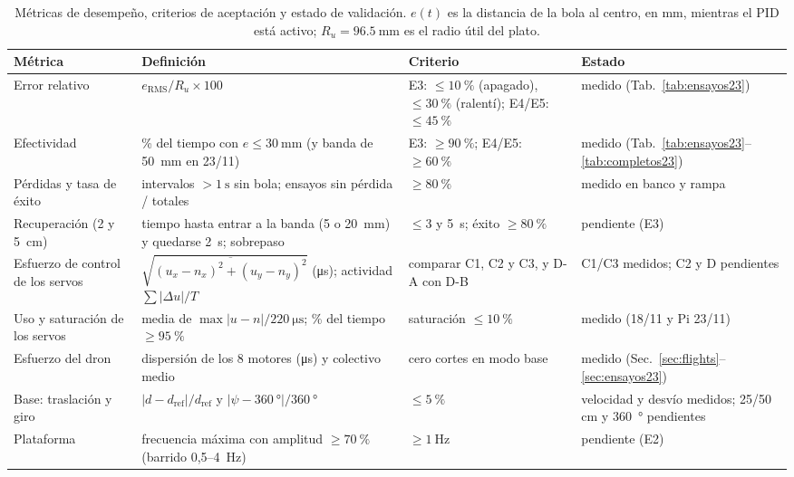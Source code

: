 \begin{table}[!htbp]
\centering
\small
\caption{Métricas de desempeño, criterios de aceptación y estado de validación. $e(t)$ es la distancia de la bola al centro, en mm, mientras el PID está activo; $R_u=\SI{96.5}{\milli\metre}$ es el radio útil del plato.}
\label{tab:metricas}
\begin{tabularx}{\textwidth}{@{}>{\raggedright\arraybackslash}p{}>{\raggedright\arraybackslash}X>{\raggedright\arraybackslash}p{}>{\raggedright\arraybackslash}p{}@{}}
\toprule
Métrica & Definición & Criterio & Estado \\
\midrule
Error relativo & $e_{\mathrm{RMS}}/R_u\times100$ & E3: $\le\SI{10}{\percent}$ (apagado), $\le\SI{30}{\percent}$ (ralentí); E4/E5: $\le\SI{45}{\percent}$ & medido (Tab.~\ref{tab:ensayos23}) \\
Efectividad & \% del tiempo con $e\le\SI{30}{\milli\metre}$ (y banda de \SI{50}{\milli\metre} en 23/11) & E3: $\ge\SI{90}{\percent}$; E4/E5: $\ge\SI{60}{\percent}$ & medido (Tab.~\ref{tab:ensayos23}--\ref{tab:completos23}) \\
Pérdidas y tasa de éxito & intervalos $>\SI{1}{\second}$ sin bola; ensayos sin pérdida / totales & $\ge\SI{80}{\percent}$ & medido en banco y rampa \\
Recuperación (2 y \SI{5}{\centi\metre}) & tiempo hasta entrar a la banda (5 o \SI{20}{\milli\metre}) y quedarse \SI{2}{\second}; sobrepaso & $\le$3 y \SI{5}{\second}; éxito $\ge\SI{80}{\percent}$ & pendiente (E3) \\
Esfuerzo de control de los servos & $\sqrt{\overline{(u_x-n_x)^2+(u_y-n_y)^2}}$ (\si{\micro\second}); actividad $\sum|\Delta u|/T$ & comparar C1, C2 y C3, y D-A con D-B & C1/C3 medidos; C2 y D pendientes \\
Uso y saturación de los servos & media de $\max|u-n|/\SI{220}{\micro\second}$; \% del tiempo $\ge\SI{95}{\percent}$ & saturación $\le\SI{10}{\percent}$ & medido (18/11 y Pi 23/11) \\
Esfuerzo del dron & dispersión de los 8 motores (\si{\micro\second}) y colectivo medio & cero cortes en modo base & medido (Sec.~\ref{sec:flights}--\ref{sec:ensayos23}) \\
Base: traslación y giro & $|d-d_{\mathrm{ref}}|/d_{\mathrm{ref}}$ y $|\psi-\SI{360}{\degree}|/\SI{360}{\degree}$ & $\le\SI{5}{\percent}$ & velocidad y desvío medidos; 25/50\,cm y \SI{360}{\degree} pendientes \\
Plataforma & frecuencia máxima con amplitud $\ge\SI{70}{\percent}$ (barrido 0,5--\SI{4}{\hertz}) & $\ge\SI{1}{\hertz}$ & pendiente (E2) \\
\bottomrule
\end{tabularx}
\end{table}

